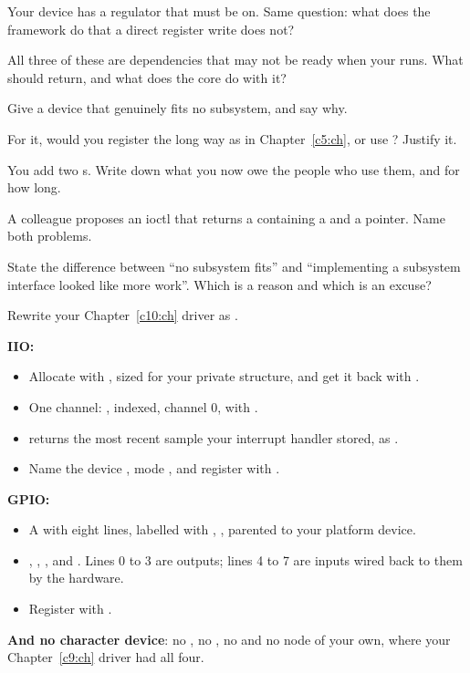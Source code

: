  Your device has a regulator that must be on. Same question: what does the framework do
that a direct register write does not?

 All three of these are dependencies that may not be ready when your  runs.
What should  return, and what does the core do with it?

\label{c11:ex:5}

 Give a device that genuinely fits no subsystem, and say why.

 For it, would you register the long way as in Chapter~\ref{c5:ch}, or use
? Justify it.

 You add two s. Write down what you now owe the people who use them, and for
how long.

 A colleague proposes an ioctl that returns a  containing a  and a
pointer. Name both problems.

 State the difference between ``no subsystem fits'' and ``implementing a subsystem
interface looked like more work''. Which is a reason and which is an excuse?

\label{c11:ex:6}

Rewrite your Chapter~\ref{c10:ch} driver as .

\textbf{IIO:}
\begin{itemize}
  \item Allocate with , sized for your private structure, and get it
    back with .
  \item One channel: , indexed, channel 0, with .
  \item {} returns the most recent sample your interrupt handler stored, as
    .
  \item Name the device , mode , and register with
    .
\end{itemize}
\textbf{GPIO:}
\begin{itemize}
  \item A  with eight lines, labelled with , , parented to your platform device.
  \item {}, , ,  and
    . Lines 0 to 3 are outputs; lines 4 to 7 are inputs wired back to them by
    the hardware.
  \item Register with .
\end{itemize}
\textbf{And no character device}: no , no , no  and no
 node of your own, where your Chapter~\ref{c9:ch} driver had all four.

